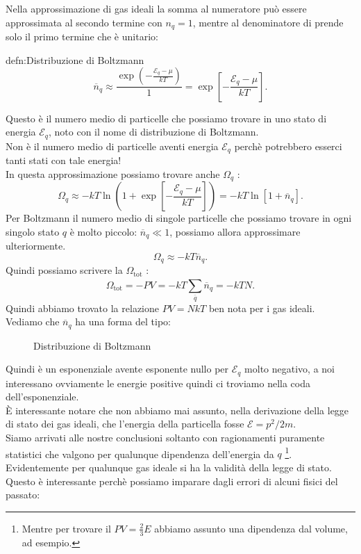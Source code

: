 Nella approssimazione di gas ideali la somma al numeratore può essere approssimata al secondo termine con $n_{q} = 1$, mentre al denominatore di prende solo il primo termine che è unitario:
\begin{defn}{defn:Distribuzione di Boltzmann}
\[
	\overline{n}_{q} \approx \frac{\exp\left( - \frac{\mathcal{E}_{q}-\mu}{kT} \right) }{1} = \exp\left[ -\frac{\mathcal{E}_{q}-\mu}{kT} \right] 
.\] 
\end{defn}
Questo è il numero medio di particelle che possiamo trovare in uno stato di energia $\mathcal{E}_{q}$, noto con il nome di distribuzione di Boltzmann.\\
Non è il numero medio di particelle aventi energia $\mathcal{E}_{q}$ perchè potrebbero esserci tanti stati con tale energia!\\
In questa approssimazione possiamo trovare anche $\Omega_{q}$ :
\[
	\Omega_{q} \approx -kT \ln \left( 1+ \exp \left[ -\frac{\mathcal{E}_{q}-\mu}{kT} \right]  \right) = -kT \ln \left[ 1+ \overline{n}_{q} \right]	\label{eq:Landau-ordine_0}
.\] 
Per Boltzmann il numero medio di singole particelle che possiamo trovare in ogni singolo stato $q$ è molto piccolo: $\overline{n}_{q}\ll 1$, possiamo allora approssimare ulteriormente.
\[
	\Omega_{q} \approx -kT \overline{n}_{q} \label{eq:Landau_Boltzmann}
.\] 
Quindi possiamo scrivere la $\Omega_{\text{tot}}$ : 
\[
	\Omega_{\text{tot}} = - PV = -kT \sum_{\overline{q}}^{} \overline{n}_{q} = -kT N
.\] 
Quindi abbiamo trovato la relazione $PV = NkT$ ben nota per i gas ideali.\\
Vediamo che $\overline{n}_{q}$ ha una forma del tipo:
\begin{figure}[H]
    \centering
    \caption{Distribuzione di Boltzmann}
    \label{fig:distribuzione-di-boltzmann}
\end{figure}
\noindent
Quindi è un esponenziale avente esponente nullo per $\mathcal{E}_{q}$ molto negativo, a noi interessano ovviamente le energie positive quindi ci troviamo nella coda dell'esponenziale.\\
È interessante notare che non abbiamo mai assunto, nella derivazione della legge di stato dei gas ideali, che l'energia della particella fosse $\mathcal{E}= p^2 /2m$.\\
Siamo arrivati alle nostre conclusioni soltanto con ragionamenti puramente statistici che valgono per qualunque dipendenza dell'energia da $q$ \footnote{Mentre per trovare il $PV = \frac{2}{3}E$ abbiamo assunto una dipendenza dal volume, ad esempio.}.\\
Evidentemente per qualunque gas ideale si ha la validità della legge di stato. Questo è interessante perchè possiamo imparare dagli errori di alcuni fisici del passato:
